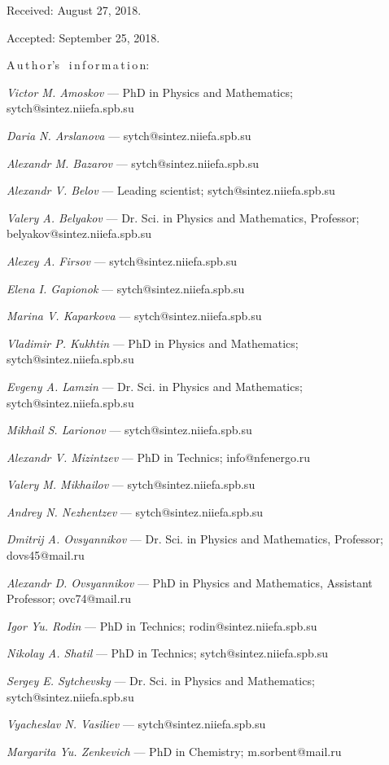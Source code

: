 {\vskip 1.5mm

%

Received:  August 27, 2018.

Accepted: September 25, 2018.

\vskip6mm A\,u\,t\,h\,o\,r's \ i\,n\,f\,o\,r\,m\,a\,t\,i\,o\,n:

\vskip2mm\textit{Victor M. Amoskov} --- PhD in Physics and
Mathematics; sytch@sintez.niiefa.spb.su

\vskip2mm\textit{Daria N. Arslanova} ---
sytch@sintez.niiefa.spb.su

\vskip2mm\textit{Alexandr M. Bazarov} ---
sytch@sintez.niiefa.spb.su

\vskip2mm\textit{Alexandr V. Belov} --- Leading scientist;
sytch@sintez.niiefa.spb.su

\vskip2mm\textit{Valery A. Belyakov} --- Dr. Sci. in Physics and
Mathematics, Professor; belyakov@sintez.niiefa.spb.su

\vskip2mm\textit{Alexey A. Firsov} --- sytch@sintez.niiefa.spb.su

\vskip2mm\textit{Elena I. Gapionok} --- sytch@sintez.niiefa.spb.su

\vskip2mm\textit{Marina V. Kaparkova} ---
sytch@sintez.niiefa.spb.su

\vskip2mm\textit{Vladimir P. Kukhtin} --- PhD in Physics and
Mathematics; sytch@sintez.niiefa.spb.su

\vskip2mm\textit{Evgeny A. Lamzin} --- Dr. Sci. in Physics and
Mathematics; sytch@sintez.niiefa.spb.su

\vskip2mm\textit{Mikhail S. Larionov} ---
sytch@sintez.niiefa.spb.su

\vskip2mm\textit{Alexandr V. Mizintzev} --- PhD in Technics;
 info@nfenergo.ru

\vskip2mm\textit{Valery M. Mikhailov} ---
sytch@sintez.niiefa.spb.su

\vskip2mm\textit{Andrey N. Nezhentzev} ---
sytch@sintez.niiefa.spb.su

\vskip2mm\textit{Dmitrij A. Ovsyannikov} --- Dr. Sci. in Physics
and Mathematics, Professor; dovs45@mail.ru

\vskip2mm\textit{Alexandr D. Ovsyannikov} --- PhD in Physics and
Mathematics, Assistant Professor; ovc74@mail.ru

\vskip2mm\textit{Igor Yu. Rodin} --- PhD in Technics;
rodin@sintez.niiefa.spb.su

\vskip2mm\textit{Nikolay A. Shatil} --- PhD in Technics;
sytch@sintez.niiefa.spb.su

\vskip2mm\textit{Sergey E. Sytchevsky} --- Dr. Sci. in Physics and
Mathematics; sytch@sintez.niiefa.spb.su

\vskip2mm\textit{Vyacheslav N. Vasiliev} ---
sytch@sintez.niiefa.spb.su

\vskip2mm\textit{Margarita Yu. Zenkevich} --- PhD in Chemistry;
m.sorbent@mail.ru

}
